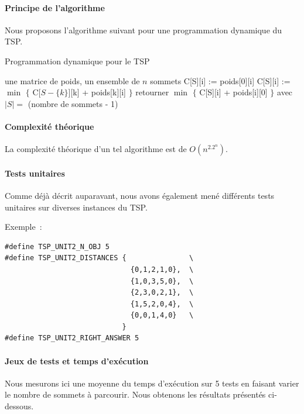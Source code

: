 \documentclass[a4paper, 12pt]{article}
\begin{document}
\paragraph{Principe de l'algorithme}

Nous proposons l'algorithme suivant pour une programmation dynamique
du TSP.

\begin{algorithm}[!ht]
\caption{Programmation dynamique pour le TSP}
\label{Dyntsp}
\begin{algorithmic}[1]
\REQUIRE une matrice de poids, un ensemble de $n$ sommets
\STATE C[S][i] := poids[0][i]
\ENDFOR
\ELSE
{}
\STATE C[S][i] := $\min$ $\{$ C[$S - \{ k \} $][k] + poids[k][i] $\}$
\ENDFOR
\ENDFOR
\ENDIF
\ENDFOR
\STATE retourner $\min$ $\{$ C[S][i] + poids[i][0] $\}$ avec $|S| = $
(nombre de sommets - 1)
\end{algorithmic}
\end{algorithm}

\paragraph{Complexité théorique}

La complexité théorique d'un tel algorithme est de $O(n^2.2^n)$.

\paragraph{Tests unitaires}

Comme déjà décrit auparavant, nous avons également mené différents
tests unitaires sur diverses instances du TSP. 


Exemple~:

\begin{lstlisting}
#define TSP_UNIT2_N_OBJ 5
#define TSP_UNIT2_DISTANCES {               \
                              {0,1,2,1,0},  \
                              {1,0,3,5,0},  \
                              {2,3,0,2,1},  \
                              {1,5,2,0,4},  \
                              {0,0,1,4,0}   \
                            }
#define TSP_UNIT2_RIGHT_ANSWER 5
\end{lstlisting}

\paragraph{Jeux de tests et temps d'exécution}
Nous mesurons ici une moyenne du temps d'exécution sur 5 tests en
faisant varier le nombre de sommets à parcourir. Nous obtenons les
résultats présentés ci-dessous.
\end{document}
